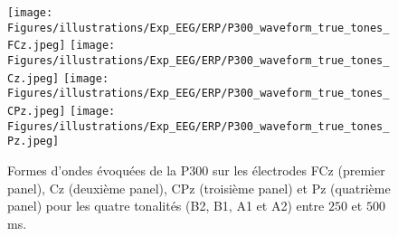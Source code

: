 \begin{figure*}[!t]
\centering
\texttt{[image: Figures/illustrations/Exp\_EEG/ERP/P300\_waveform\_true\_tones\_FCz.jpeg]}
\texttt{[image: Figures/illustrations/Exp\_EEG/ERP/P300\_waveform\_true\_tones\_Cz.jpeg]}
\texttt{[image: Figures/illustrations/Exp\_EEG/ERP/P300\_waveform\_true\_tones\_CPz.jpeg]}
\texttt{[image: Figures/illustrations/Exp\_EEG/ERP/P300\_waveform\_true\_tones\_Pz.jpeg]}
\caption[Formes d'ondes évoquées de la P300 sur FCz, Cz, CPz et Pz entre $250$ et $500$ ms]{Formes d'ondes évoquées de la P300 sur les électrodes FCz (premier panel), Cz (deuxième panel), CPz (troisième panel) et Pz (quatrième panel) pour les quatre tonalités (B2, B1, A1 et A2) entre $250$ et $500$ ms.}
\label{fig:figure5amplitudeerpelectrodesP300waveform}
\end{figure*}

